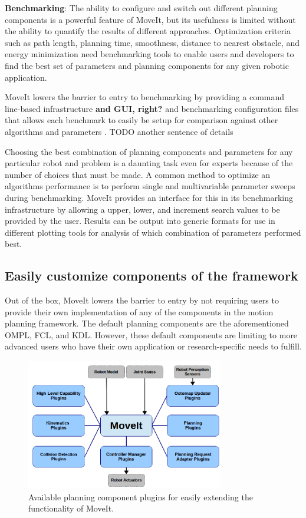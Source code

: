 \documentclass[10pt,journal,compsoc]{joser1}
\begin{document}
{{\bf Benchmarking}: The ability to configure and switch out different planning components is a powerful feature of MoveIt, but its usefulness is limited without the ability to quantify the results of different approaches. Optimization criteria such as path length, planning time, smoothness, distance to nearest obstacle, and energy minimization need benchmarking tools to enable users and developers to find the best set of parameters and planning components for any given robotic application.

MoveIt lowers the barrier to entry to benchmarking by providing a command line-based infrastructure \textbf{and GUI, right?} and benchmarking configuration files that allows each benchmark to easily be setup for comparison against other algorithms and parameters \cite{cohen2012generic}. TODO another sentence of details

Choosing the best combination of planning components and parameters for any particular robot and problem is a daunting task even for experts because of the number of choices that must be made\cite{cohen2012generic}. A common method to optimize an algorithms performance is to perform single and multivariable parameter sweeps during benchmarking. MoveIt provides an interface for this in its benchmarking infrastructure by allowing a upper, lower, and increment search values to be provided by the user. Results can be output into generic formats for use in different plotting tools for analysis of which combination of parameters performed best.

\subsection{Easily customize components of the framework}
\label{subsec:extensiblity}

Out of the box, MoveIt lowers the barrier to entry by not requiring users to provide their own implementation of any of the components in the motion planning framework. The default planning components are the aforementioned OMPL, FCL, and KDL. However, these default components are limiting to more advanced users who have their own application or research-specific needs to fulfill. 

\begin{figure}[!t]
\centering
\includegraphics[width=3.4in]{images/moveit_plugins}
\caption{Available planning component plugins for easily extending the functionality of MoveIt.}
\label{fig:moveit_plugins}
\end{figure}

}
\end{document}
